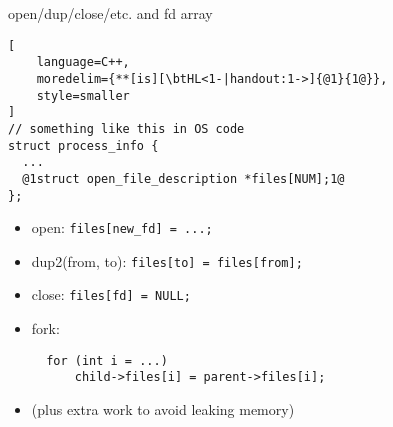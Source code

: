 \begin{frame}[fragile,label=openCloseAndFdArray]{open/dup/close/etc. and fd array}
\begin{lstlisting}[
    language=C++,
    moredelim={**[is][\btHL<1-|handout:1->]{@1}{1@}},
    style=smaller
]
// something like this in OS code
struct process_info {
  ...
  @1struct open_file_description *files[NUM];1@  
};
\end{lstlisting}
\begin{itemize}
\item open: \lstinline|files[new_fd] = ...;|
\item dup2(from, to): \lstinline|files[to] = files[from];|
\item close: \lstinline|files[fd] = NULL;|
\item fork: 
\begin{lstlisting}
  for (int i = ...)
      child->files[i] = parent->files[i];
\end{lstlisting}
\vspace{.25cm}
\item (plus extra work to avoid leaking memory)
\end{itemize}
\end{frame}
